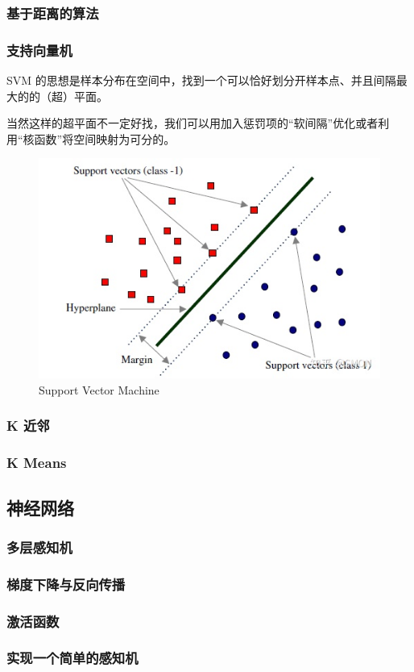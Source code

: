 \documentclass{ctexbeamer}
\begin{document}
\subsubsection{基于距离的算法}
\begin{frame}
    \frametitle{支持向量机}
    SVM 的思想是样本分布在空间中，找到一个可以恰好划分开样本点、并且间隔最大的的（超）平面。
    
    当然这样的超平面不一定好找，我们可以用加入惩罚项的“软间隔”优化或者利用“核函数”将空间映射为可分的。
    
    \begin{center}
        \begin{figure}
            \includegraphics[width=0.6\linewidth]{../lib/SVM.jpeg}
            \caption{Support Vector Machine}
        \end{figure}
    \end{center}
\end{frame}
\begin{frame}
    \frametitle{K 近邻}

\end{frame}
\begin{frame}
    \frametitle{K Means}
    
\end{frame}
\subsection{神经网络}
\subsubsection{多层感知机}
\begin{frame}
    \frametitle{梯度下降与反向传播}
\end{frame}
\begin{frame}
    \frametitle{激活函数}
\end{frame}
\begin{frame}
    \frametitle{实现一个简单的感知机}
\end{frame}
\end{document}
